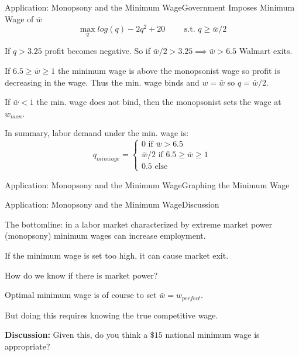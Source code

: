 \documentclass[aspectratio=169]{beamer}
\newenvironment{wideitemize}{\itemize\addtolength{\itemsep}{10pt}}{\enditemize}
\begin{document}
\begin{frame}{Application: Monopsony and the Minimum Wage}{Government Imposes Minimum Wage of $\bar w$}
        \[\max_q log(q) - 2q^2 +20 \qquad \text{ s.t. } q\geq \bar w/2 \]
\begin{wideitemize}
          \item If $q> 3.25$ profit becomes negative. So if $\bar w/2 > 3.25 \implies \bar w > 6.5$ Walmart exits.
          \item  If $6.5\geq \bar w \geq 1$ the minimum wage is above the monopsonist wage so profit is decreasing in the wage. Thus the min. wage binds and $w = \bar w$ so $q=\bar w/2$.
          \item If $\bar w<1$ the min. wage does not bind, then the monopsonist sets the wage at $w_{mon}$.
        \item In summary, labor demand under the min. wage is:
        \[q_{minwage} = \begin{cases} 0 \text{ if } \bar w > 6.5\\
        \bar w/2 \text{ if }  6.5\geq \bar w \geq 1\\
        0.5 \text{ else }\end{cases}\]

\end{wideitemize}

  \end{frame}
\begin{frame}{Application: Monopsony and the Minimum Wage}{Graphing the Minimum Wage}

 
    \end{frame}
    
\begin{frame}{Application: Monopsony and the Minimum Wage}{Discussion}
\begin{wideitemize}
        \item The bottomline: in a labor market characterized by extreme market power (monopsony) minimum wages can increase employment.
        \item If the minimum wage is set too high, it can cause market exit.
        \item How do we know if there is market power?
        \item Optimal minimum wage is of course to set $\bar w=w_{perfect}$.
        \item But doing this requires knowing the true competitive wage.
        \item \textbf{Discussion:} Given this, do you think a $\$15$ national minimum wage is appropriate?
\end{wideitemize}
\end{frame}
\end{document}
